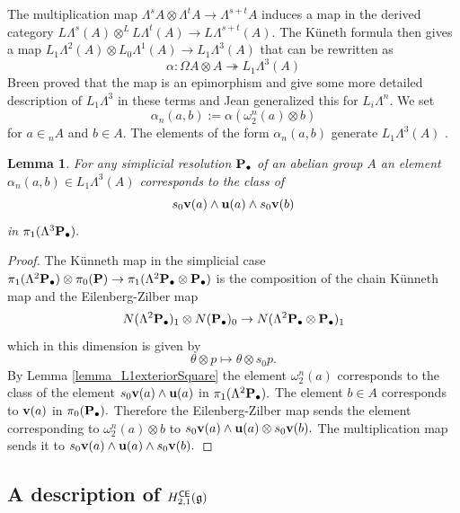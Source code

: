 \documentclass{amsart}
\numberwithin{equation}{section}
\newtheorem{lemma}[theorem]{Lemma}
\theoremstyle{definition}
\def\epi{\twoheadrightarrow}
\def\gg{\mathfrak{g}}
\begin{document}
The multiplication map $\Lambda^sA\otimes \Lambda^tA\to \Lambda^{s+t}A$ induces a map in the derived category 
$L\Lambda^s(A) \otimes^{L} L\Lambda^t(A) \longrightarrow L\Lambda^{s+t}(A).$ The K\"uneth formula then gives a map
$L_1\Lambda^2 (A) \otimes L_0 \Lambda^1 (A) \to L_1 \Lambda^3(A) $ that can be rewritten as 
$$\alpha: \Omega A\otimes A \epi  L_1\Lambda^3(A) $$
Breen proved that the map is an epimorphism and give some more detailed description of $L_1\Lambda^3$ in these terms and Jean generalized this for $L_i\Lambda^n.$ 
We set $$\alpha_n(a,b):=\alpha(\omega^n_2(a)\otimes b)$$ for $a\in {}_nA$ and $b\in A.$ The elements of the form $\alpha_n(a,b)$ generate $L_1\Lambda^3(A)$ \cite[Prop.6.15]{breen1999functorial}. 

\begin{lemma} \label{lemma_alpha_n}
For any simplicial resolution ${\bf P}_\bullet$ of an abelian group $A$ an element $\alpha_n(a,b)\in L_1\Lambda^3(A)$ corresponds to the class of $$s_0{\bf v}(a)\wedge {\bf u}(a) \wedge s_0{\bf v}(b)$$ in $\pi_1(\Lambda^3 {\bf P}_\bullet ).$ 
\end{lemma}
\begin{proof} The K\"unneth map in the simplicial case 
$\pi_1(\Lambda^2 {\bf P}_\bullet )\otimes \pi_0({\bf P} ) \to \pi_1( \Lambda^2 {\bf P}_\bullet \otimes {\bf P}_\bullet ) $ 
is the composition of the chain K\"unneth map and the Eilenberg-Zilber map
$$N(\Lambda^2 {\bf P}_\bullet)_1\otimes N({\bf P}_\bullet)_0 \to N(\Lambda^2 {\bf P}_\bullet \otimes {\bf P}_\bullet  )_1 $$
which  in this dimension is given by 
$$ \theta \otimes p \mapsto \theta \otimes s_0p.$$
By Lemma \ref{lemma_L1exteriorSquare} the element $\omega_2^n(a)$ corresponds to the class of the element $s_0{\bf v}(a) \wedge {\bf u}(a)$ in $\pi_1( \Lambda^2 {\bf P}_\bullet ).$ The element $b\in A$ corresponds to ${\bf v}(a)$ in $\pi_0( {\bf P}_\bullet).$ Therefore the Eilenberg-Zilber map sends the element corresponding to $\omega_2^n(a)\otimes b$ to $s_0{\bf v}(a)\wedge {\bf u}(a) \otimes s_0{\bf v}(b).$ The multiplication  map sends it to  $s_0{\bf v}(a)\wedge {\bf u}(a) \wedge s_0{\bf v}(b).$
\end{proof}

\subsection{A description of $H_{2,1}^{\sf CE}(\gg)$} 
\end{document}
